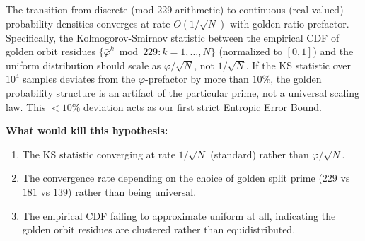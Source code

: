 \begin{hypothesis}\label{hyp:golden_convergence}
The transition from discrete (mod-229 arithmetic) to continuous (real-valued) probability densities converges at rate $O(1/\sqrt{N})$ with golden-ratio prefactor. Specifically, the Kolmogorov-Smirnov statistic between the empirical CDF of golden orbit residues $\{\bar{\varphi}^k \bmod 229 : k = 1, \ldots, N\}$ (normalized to $[0,1]$) and the uniform distribution should scale as $\varphi / \sqrt{N}$, not $1/\sqrt{N}$. If the KS statistic over $10^4$ samples deviates from the $\varphi$-prefactor by more than $10\%$, the golden probability structure is an artifact of the particular prime, not a universal scaling law. This $<10\%$ deviation acts as our first strict Entropic Error Bound.
\end{hypothesis}

\textbf{What would kill this hypothesis:}
\begin{enumerate}[noitemsep]
  \item The KS statistic converging at rate $1/\sqrt{N}$ (standard) rather than $\varphi/\sqrt{N}$.
  \item The convergence rate depending on the choice of golden split prime ($229$ vs $181$ vs $139$) rather than being universal.
  \item The empirical CDF failing to approximate uniform at all, indicating the golden orbit residues are clustered rather than equidistributed.
\end{enumerate}

